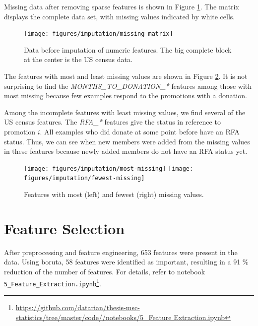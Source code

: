 \documentclass[
  11pt,
  a4paper,
  DIV=12,captions=tableheading,oneside,titlepage]{scrbook}
\begin{document}
Missing data after removing sparse features is shown in Figure \ref{fig:before-impute}. The matrix displays the complete data set, with missing values indicated by white cells.



\begin{figure}

{\centering \texttt{[image: figures/imputation/missing-matrix]} 

}

\caption{Data before imputation of numeric features. The big complete block at the center is the US census data. }\label{fig:before-impute}
\end{figure}

The features with most and least missing values are shown in Figure \ref{fig:most-fewest-missing}. It is not surprising to find the \emph{MONTHS\_TO\_DONATION\_*} features among those with most missing because few examples respond to the promotions with a donation.

Among the incomplete features with least missing values, we find several of the US census features. The \emph{RFA\_*} features give the status in reference to promotion \(i\). All examples who did donate at some point before have an RFA status. Thus, we can see when new members were added from the missing values in these features because newly added members do not have an RFA status yet.



\begin{figure}

{\centering \texttt{[image: figures/imputation/most-missing]} \texttt{[image: figures/imputation/fewest-missing]} 

}

\caption{Features with most (left) and fewest (right) missing values.}\label{fig:most-fewest-missing}
\end{figure}

\hypertarget{feature-selection}{%
\section{Feature Selection}\label{feature-selection}}

After preprocessing and feature engineering, 653 features were present in the data. Using boruta, 58 features were identified as important, resulting in a 91 \% reduction of the number of features. For details, refer to notebook \texttt{5\_Feature\_Extraction.ipynb}\footnote{\href{https://github.com/datarian/thesis-msc-statistics/tree/master/code//notebooks/5_Feature\%20Extraction.ipynb}{https://github.com/datarian/thesis-msc-statistics/tree/master/code//notebooks/5\_Feature Extraction.ipynb}}.
\end{document}
